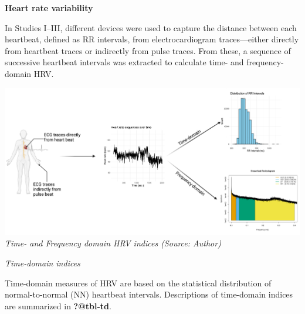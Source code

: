 \documentclass[
  letterpaper,
  headsepline=true,
  open=any]{scrbook}
\begin{document}
\textbf{Heart rate variability}

In Studies I--III, different devices were used to capture the distance
between each heartbeat, defined as RR intervals, from electrocardiogram
traces---either directly from heartbeat traces or indirectly from pulse
traces. From these, a sequence of successive heartbeat intervals was
extracted to calculate time- and frequency-domain HRV.

\includegraphics{images/measurements_hrv.pdf} \emph{Time- and Frequency
domain HRV indices (Source: Author)}

\emph{Time-domain indices}

Time-domain measures of HRV are based on the statistical distribution of
normal-to-normal (NN) heartbeat intervals. Descriptions of time-domain
indices are summarized in \textbf{?@tbl-td}.
\end{document}
